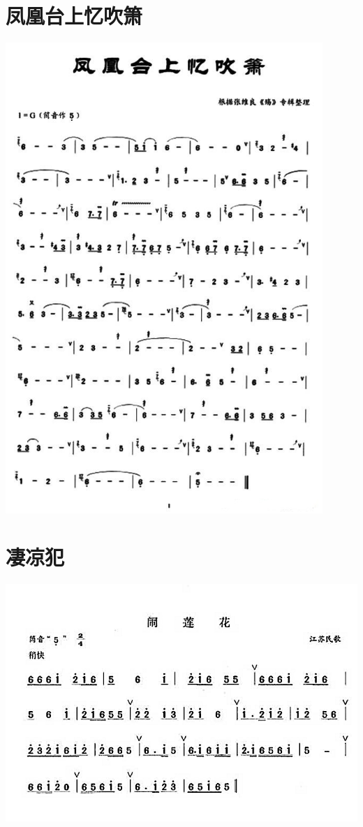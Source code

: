 \documentclass[cn,pad,chinese,chinesefont=nofont]{elegantbook}
\begin{document}
\section{凤凰台上忆吹箫}
    \includegraphics[width=0.9\textwidth]{dongxiao/20200323凤凰台上忆吹箫.jpg}
\section{凄凉犯}
    \includegraphics[width=\textwidth]{dongxiao/20200323凄凉犯.jpg}
\end{document}

